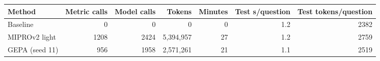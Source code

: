 \begin{tabular}{lrrrrrr}
\hline
Method & Metric calls & Model calls & Tokens & Minutes & Test s/question & Test tokens/question \\ \hline
Baseline & 0 & 0 & 0 & 0 & 1.2 & 2382 \\
MIPROv2 light & 1208 & 2424 & 5{,}394{,}957 & 27 & 1.2 & 2759 \\
GEPA (seed 11) & 956 & 1958 & 2{,}571{,}261 & 21 & 1.1 & 2519 \\
\hline
\end{tabular}

